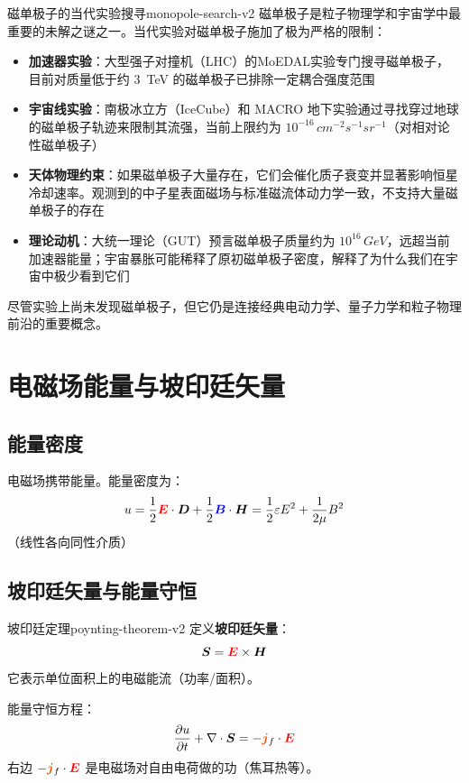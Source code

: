 \documentclass[11pt,a4paper,openany,oneside]{book}
\newcommand{\vecE}{\textcolor{red}{\vect{E}}}
\newcommand{\vecB}{\textcolor{blue}{\vect{B}}}
\newcommand{\vecJ}{\textcolor{cororange}{\vect{j}}}
\newcommand{\eps}{\varepsilon}
\newcommand{\vect}[1]{\bm{#1}}
\newcommand{\divg}{\nabla\cdot}
\begin{document}
\begin{history}{磁单极子的当代实验搜寻}{monopole-search-v2}
磁单极子是粒子物理学和宇宙学中最重要的未解之谜之一。当代实验对磁单极子施加了极为严格的限制：

\begin{itemize}
\item \textbf{加速器实验}：大型强子对撞机（LHC）的MoEDAL实验专门搜寻磁单极子，目前对质量低于约 \SI{3}{\tera\eV} 的磁单极子已排除一定耦合强度范围
\item \textbf{宇宙线实验}：南极冰立方（IceCube）和 MACRO 地下实验通过寻找穿过地球的磁单极子轨迹来限制其流强，当前上限约为 $10^{-16}\,\si{cm^{-2}s^{-1}sr^{-1}}$（对相对论性磁单极子）
\item \textbf{天体物理约束}：如果磁单极子大量存在，它们会催化质子衰变并显著影响恒星冷却速率。观测到的中子星表面磁场与标准磁流体动力学一致，不支持大量磁单极子的存在
\item \textbf{理论动机}：大统一理论（GUT）预言磁单极子质量约为 $10^{16}\,\si{GeV}$，远超当前加速器能量；宇宙暴胀可能稀释了原初磁单极子密度，解释了为什么我们在宇宙中极少看到它们
\end{itemize}

尽管实验上尚未发现磁单极子，但它仍是连接经典电动力学、量子力学和粒子物理前沿的重要概念。
\end{history}

\section{电磁场能量与坡印廷矢量}

\subsection{能量密度}

电磁场携带能量。能量密度为：
\[
u = \frac{1}{2}\vecE\cdot\vect{D} + \frac{1}{2}\vecB\cdot\vect{H} = \frac{1}{2}\eps E^2 + \frac{1}{2\mu}B^2
\]
（线性各向同性介质）

\subsection{坡印廷矢量与能量守恒}

\begin{theorem}{坡印廷定理}{poynting-theorem-v2}
定义\textbf{坡印廷矢量}：
\[
\vect{S} = \vecE \times \vect{H}
\]
它表示单位面积上的电磁能流（功率/面积）。

能量守恒方程：
\[
\frac{\partial u}{\partial t} + \divg\vect{S} = -\vecJ_f\cdot\vecE
\]
右边 $-\vecJ_f\cdot\vecE$ 是电磁场对自由电荷做的功（焦耳热等）。
\end{theorem}
\end{document}

